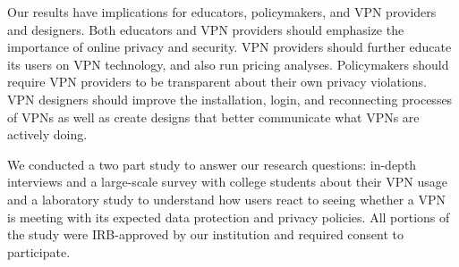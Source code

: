 Our results have implications for educators, policymakers, and VPN providers
and designers. Both educators and VPN providers should emphasize the
importance of online privacy and security. VPN providers should further
educate its users on VPN technology, and also run pricing analyses.
Policymakers should require VPN providers to be transparent about their own
privacy violations. VPN designers should improve the installation, login, and
reconnecting processes of VPNs as well as create designs that better
communicate what VPNs are actively doing.

We conducted a two part study to answer our research questions:  in-depth
interviews and  a large-scale survey with college students about their VPN
usage and a laboratory study to understand how users react to seeing whether a
VPN is meeting with its expected data protection and privacy policies. All
portions of the study were IRB-approved by our institution and required
consent to participate.
